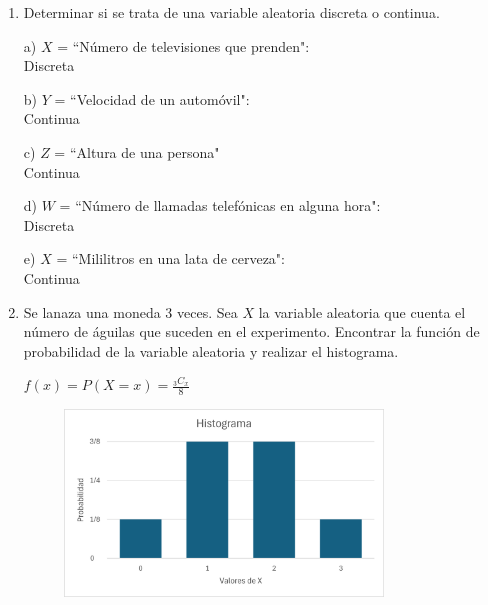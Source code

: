 \documentclass[a4paper, 12pt]{article}
\newcommand{\Pspace}{0.5cm}
\newcommand{\Aspace}{0.2cm}
\begin{document}
\begin{enumerate}
    \item Determinar si se trata de una variable aleatoria discreta o continua.
    \vspace{\Aspace} \par
    a) $X$ = ``Número de televisiones que prenden":
    \\ { \color{azul} Discreta }

    \vspace{\Aspace} \par
    b) $Y$ = ``Velocidad de un automóvil":
    \\ { \color{azul} Continua }
    
    \vspace{\Aspace} \par
    c) $Z$ = ``Altura de una persona"
    \\ { \color{azul} Continua }

    \vspace{\Aspace} \par
    d) $W$ = ``Número de llamadas telefónicas en alguna hora":
    \\ { \color{azul} Discreta }

    \vspace{\Aspace} \par
    e) $X$ = ``Mililitros en una lata de cerveza":
    \\ { \color{azul} Continua }


    \newpage
    \vspace{\Pspace}
    \item Se lanaza una moneda 3 veces. Sea $X$ la variable aleatoria que cuenta el número de águilas que suceden en el experimento. Encontrar la función de probabilidad de la variable aleatoria y realizar el histograma.
    \vspace{\Aspace} \par
    { \color{azul} $f(x) = P(X = x) = \frac{_{3}C_{x}}{8}$ }
    \begin{figure}[h]
        \vspace{\Aspace}
        \centering
        \includegraphics[width=0.8\textwidth]{./Assets/HistogramaT5P2.png}
    \end{figure}
\end{enumerate}
\end{document}
